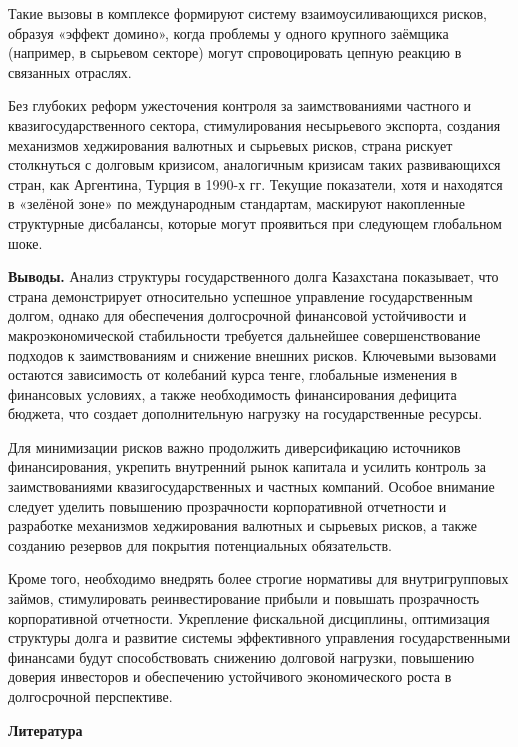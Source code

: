 \begin{multicols}{2}
Такие вызовы в комплексе формируют систему взаимоусиливающихся рисков,
образуя «эффект домино», когда проблемы у одного крупного заёмщика
(например, в сырьевом секторе) могут спровоцировать цепную реакцию в
связанных отраслях.

Без глубоких реформ ужесточения контроля за заимствованиями частного и
квазигосударственного сектора, стимулирования несырьевого экспорта,
создания механизмов хеджирования валютных и сырьевых рисков, страна
рискует столкнуться с долговым кризисом, аналогичным кризисам таких
развивающихся стран, как Аргентина, Турция в 1990-х гг. Текущие
показатели, хотя и находятся в «зелёной зоне» по международным
стандартам, маскируют накопленные структурные дисбалансы, которые могут
проявиться при следующем глобальном шоке.

{\bfseries Выводы.} Анализ структуры государственного долга Казахстана
показывает, что страна демонстрирует относительно успешное управление
государственным долгом, однако для обеспечения долгосрочной финансовой
устойчивости и макроэкономической стабильности требуется дальнейшее
совершенствование подходов к заимствованиям и снижение внешних рисков.
Ключевыми вызовами остаются зависимость от колебаний курса тенге,
глобальные изменения в финансовых условиях, а также необходимость
финансирования дефицита бюджета, что создает дополнительную нагрузку на
государственные ресурсы.

Для минимизации рисков важно продолжить диверсификацию источников
финансирования, укрепить внутренний рынок капитала и усилить контроль за
заимствованиями квазигосударственных и частных компаний. Особое внимание
следует уделить повышению прозрачности корпоративной отчетности и
разработке механизмов хеджирования валютных и сырьевых рисков, а также
созданию резервов для покрытия потенциальных обязательств.

Кроме того, необходимо внедрять более строгие нормативы для
внутригрупповых займов, стимулировать реинвестирование прибыли и
повышать прозрачность корпоративной отчетности. Укрепление фискальной
дисциплины, оптимизация структуры долга и развитие системы эффективного
управления государственными финансами будут способствовать снижению
долговой нагрузки, повышению доверия инвесторов и обеспечению
устойчивого экономического роста в долгосрочной перспективе.
\end{multicols}

\begin{center}
{\bfseries Литература}
\end{center}

